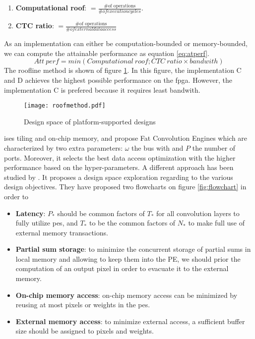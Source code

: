 \begin{enumerate}
    \item \textbf{Computational roof}: $= \frac{\text{\# of operations}}{\# of execution cycles}$.
    \item \textbf{CTC ratio}: $= \frac{\text{\# of operations}}{\# of external data access}$
\end{enumerate}
As an implementation can either be computation-bounded or memory-bounded, we can compute the attainable performance as equation \ref{eq:atperf}.
\begin{equation}
Att \ perf = min(Computational \ roof; CTC \ ratio \times bandwith)
\label{eq:atperf}
\end{equation}
The roofline method is shown of figure \ref{fig:roofmeth}. In this figure, the implementation C and D achieves the highest possible performance on the \acrshort{fpga}. However, the implementation C is prefered because it requires least bandwith.
%
\begin{figure}
    \centering
    \texttt{[image: roofmethod.pdf]}
    \caption{Design space of platform-supported designs  \cite{zhang_optimizing_2015}}
    \label{fig:roofmeth}
\end{figure} \newline \newline
%
\cite{motamedi_placid_2017} ises tiling and on-chip memory, and propose Fat Convolution Engines which are characterized by two extra parameters: $\omega$ the bus with and $P$ the number of ports. Moreover, it selects the best data access optimization with the higher performance based on the hyper-parameters.
%
A different approach has been studied by \cite{ma_optimizing_2018}. It proposes a design space exploration regarding to the various design objectives. They have proposed two flowcharts on figure \ref{fig:flowchart} in order to
\begin{itemize}
    \item \textbf{Latency}: $P_*$ should be common factors of  $T_*$ for all convolution layers to fully utilize \acrshort{pe}s, and $T_*$ to be the common factors of  $N_*$ to make full use of external memory transactions.
    \item \textbf{Partial sum storage}: to minimize the concurrent storage of partial sums in local memory and allowing to keep them into the PE, we should prior the computation of an output pixel in order to evacuate it to the external memory.
    \item \textbf{On-chip memory access}: on-chip memory access can be minimized by reusing at most pixels or weights in the \acrshort{pe}s.
    \item \textbf{External memory access}: to minimize external access, a sufficient buffer size should be assigned to pixels and weights.
\end{itemize}
